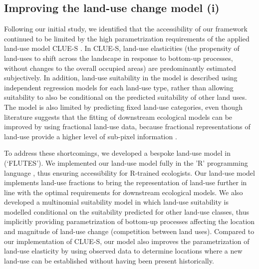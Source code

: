 \documentclass[titlesmallcaps,copyrightpage]{uomthesis}\usepackage[]{graphicx}\usepackage[]{color}
\begin{document}
\subsection{Improving the land-use change model (i)}
\label{ch5:section_lumodel}
Following our initial study, we identified that the accessibility of our framework continued to be limited by the high parametrization requirements of the applied land-use model CLUE-S \citep{verburg_modeling_2002}. In CLUE-S, land-use elasticities (the propensity of land-uses to shift across the landscape in response to bottom-up processes, without changes to the overall occupied areas) are predominantly estimated subjectively. In addition, land-use suitability in the model is described using independent regression models for each land-use type, rather than allowing suitability to also be conditional on the predicted suitability of other land uses. The model is also limited by predicting fixed land-use categories, even though literature suggests that the fitting of downstream ecological models can be improved by using fractional land-use data, because fractional representations of land-use provide a higher level of sub-pixel information  \citep[][]{bevanda_adding_2014, levers_drivers_2014, levers_drivers_2016}. 

To address these shortcomings, we developed a bespoke land-use model in  (`FLUTES'). We implemented our land-use model fully in the 'R' programming language \citep{r_development_core_team_r_2008}, thus ensuring accessibility for R-trained ecologists. Our land-use model implements land-use fractions to bring the representation of land-use further in line with the optimal requirements for downstream ecological models. We also developed a multinomial suitability model in which land-use suitability is modelled conditional on the suitability predicted for other land-use classes, thus implicitly providing parametrization of bottom-up processes affecting the location and magnitude of land-use change (competition between land uses). Compared to our implementation of CLUE-S, our model also improves the parametrization of land-use elasticity by using observed data to determine locations where a new land-use can be established without having been present historically.
\end{document}
